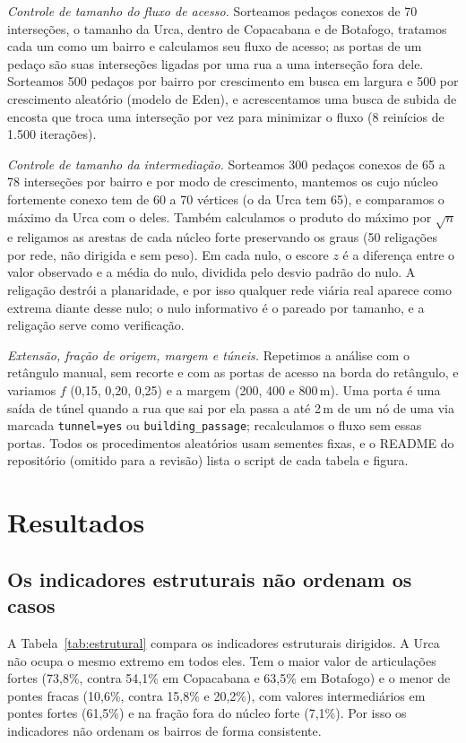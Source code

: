 \emph{Controle de tamanho do fluxo de acesso.} Sorteamos pedaços conexos
de 70 interseções, o tamanho da Urca, dentro de Copacabana e de Botafogo,
tratamos cada um como um bairro e calculamos seu fluxo de acesso; as
portas de um pedaço são suas interseções ligadas por uma rua a uma
interseção fora dele. Sorteamos 500 pedaços por bairro por crescimento em
busca em largura e 500 por crescimento aleatório (modelo de Eden), e
acrescentamos uma busca de subida de encosta que troca uma interseção por
vez para minimizar o fluxo (8 reinícios de 1.500 iterações).

\emph{Controle de tamanho da intermediação.} Sorteamos 300 pedaços
conexos de 65 a 78 interseções por bairro e por modo de crescimento,
mantemos os cujo núcleo fortemente conexo tem de 60 a 70 vértices (o da
Urca tem 65), e comparamos o máximo da Urca com o deles. Também
calculamos o produto do máximo por $\sqrt{n}$ e religamos as arestas de cada núcleo forte preservando os graus (50 religações por rede, não dirigida e
sem peso). Em cada nulo, o escore $z$ é a diferença entre o valor
observado e a média do nulo, dividida pelo desvio padrão do nulo. A
religação destrói a planaridade, e por isso qualquer rede viária real
aparece como extrema diante desse nulo; o nulo informativo é o pareado
por tamanho, e a religação serve como verificação.

\emph{Extensão, fração de origem, margem e túneis.} Repetimos a análise
com o retângulo manual, sem recorte e com as portas de acesso na borda
do retângulo, e variamos $f$ (0,15, 0,20, 0,25) e a margem (200, 400 e
800\,m). Uma porta é uma saída de túnel quando a rua que sai por ela
passa a até 2\,m de um nó de uma via marcada \texttt{tunnel=yes} ou
\texttt{building\_passage}; recalculamos o fluxo sem essas portas. Todos
os procedimentos aleatórios usam sementes fixas, e o README do
repositório (omitido para a revisão) lista o script de cada tabela e
figura.

\section{Resultados}
\label{sec:results}

\subsection{Os indicadores estruturais não ordenam os casos}
\label{sec:res-struct}

A Tabela~\ref{tab:estrutural} compara os indicadores estruturais
dirigidos. A Urca não ocupa o mesmo extremo em todos eles. Tem o maior
valor de articulações fortes (73,8\%, contra 54,1\% em Copacabana e
63,5\% em Botafogo) e o menor de pontes fracas (10,6\%, contra 15,8\% e
20,2\%), com valores intermediários em pontes fortes (61,5\%) e na
fração fora do núcleo forte (7,1\%). Por isso os indicadores não
ordenam os bairros de forma consistente.


